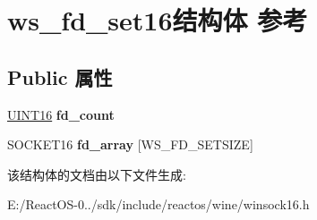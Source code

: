 \hypertarget{structws__fd__set16}{}\section{ws\+\_\+fd\+\_\+set16结构体 参考}
\label{structws__fd__set16}
\subsection*{Public 属性}
\begin{DoxyCompactItemize}
\item 
\mbox{\label{structws__fd__set16_aa9180467e61331ada9035aa2ba2ce77e}} 
\hyperlink{_processor_bind_8h_a09f1a1fb2293e33483cc8d44aefb1eb1}{U\+I\+N\+T16} {\bfseries fd\+\_\+count}
\item 
\mbox{\label{structws__fd__set16_a086b0becedbe4b0704b8ca53518b6497}} 
S\+O\+C\+K\+E\+T16 {\bfseries fd\+\_\+array} \mbox{[}W\+S\+\_\+\+F\+D\+\_\+\+S\+E\+T\+S\+I\+ZE\mbox{]}
\end{DoxyCompactItemize}


该结构体的文档由以下文件生成\+:\begin{DoxyCompactItemize}
\item 
E\+:/\+React\+O\+S-\/0../sdk/include/reactos/wine/winsock16.\+h\end{DoxyCompactItemize}
